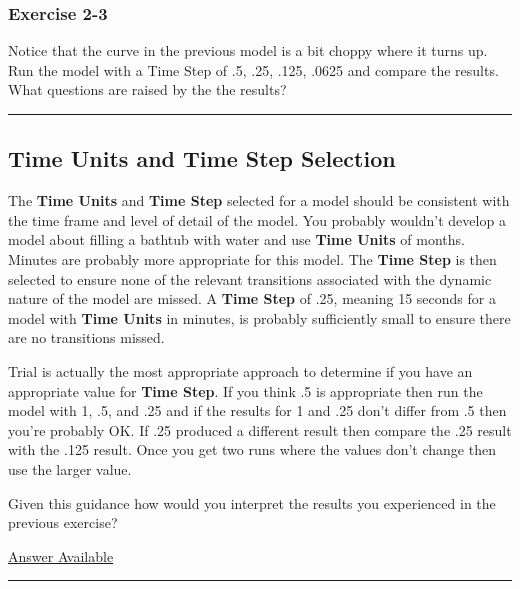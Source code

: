\documentclass[]{memoir}
\renewcommand{\u}[1]{\textbf{#1}}
\begin{document}
\subsubsection{Exercise 2-3}

Notice that the curve in the previous model is a bit choppy where it
turns up. Run the model with a Time Step of .5, .25, .125, .0625 and
compare the results. What questions are raised by the the results?

\begin{center}\rule{3in}{0.4pt}\end{center}

\subsection{Time Units and Time Step Selection}

The \u{Time Units} and \u{Time Step} selected for a model should be
consistent with the time frame and level of detail of the model. You
probably wouldn't develop a model about filling a bathtub with water and
use \u{Time Units} of months. Minutes are probably more appropriate for
this model. The \u{Time Step} is then selected to ensure none of the
relevant transitions associated with the dynamic nature of the model are
missed. A \u{Time Step} of .25, meaning 15 seconds for a model with
\u{Time Units} in minutes, is probably sufficiently small to ensure
there are no transitions missed.

Trial is actually the most appropriate approach to determine if you have
an appropriate value for \u{Time Step}. If you think .5 is appropriate
then run the model with 1, .5, and .25 and if the results for 1 and .25
don't differ from .5 then you're probably OK. If .25 produced a
different result then compare the .25 result with the .125 result. Once
you get two runs where the values don't change then use the larger
value.


Given this guidance how would you interpret the results you experienced
in the previous exercise?

\hyperref[Ans-2-4]{Answer Available}

\begin{center}\rule{3in}{0.4pt}\end{center}
\end{document}
